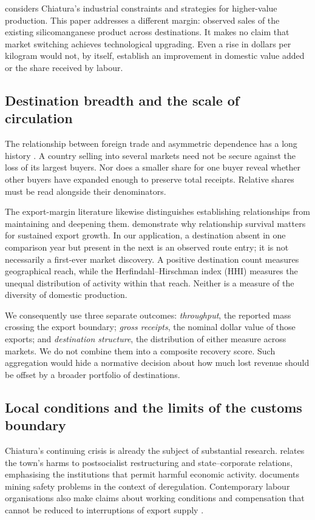 \documentclass[11pt,a4paper]{article}
\begin{document}
\citet{mataradze2025} considers Chiatura's industrial constraints and strategies for higher-value production. This paper addresses a different margin: observed sales of the existing silicomanganese product across destinations. It makes no claim that market switching achieves technological upgrading. Even a rise in dollars per kilogram would not, by itself, establish an improvement in domestic value added or the share received by labour.

\subsection{Destination breadth and the scale of circulation}
The relationship between foreign trade and asymmetric dependence has a long history \citep{hirschman1945}. A country selling into several markets need not be secure against the loss of its largest buyers. Nor does a smaller share for one buyer reveal whether other buyers have expanded enough to preserve total receipts. Relative shares must be read alongside their denominators.

The export-margin literature likewise distinguishes establishing relationships from maintaining and deepening them. \citet{besedes2011} demonstrate why relationship survival matters for sustained export growth. In our application, a destination absent in one comparison year but present in the next is an observed route entry; it is not necessarily a first-ever market discovery. A positive destination count measures geographical reach, while the Herfindahl--Hirschman index (HHI) measures the unequal distribution of activity within that reach. Neither is a measure of the diversity of domestic production.

We consequently use three separate outcomes: \emph{throughput}, the reported mass crossing the export boundary; \emph{gross receipts}, the nominal dollar value of those exports; and \emph{destination structure}, the distribution of either measure across markets. We do not combine them into a composite recovery score. Such aggregation would hide a normative decision about how much lost revenue should be offset by a broader portfolio of destinations.

\subsection{Local conditions and the limits of the customs boundary}
Chiatura's continuing crisis is already the subject of substantial research. \citet{eristavi2026} relates the town's harms to postsocialist restructuring and state--corporate relations, emphasising the institutions that permit harmful economic activity. \citet{hrw2019} documents mining safety problems in the context of deregulation. Contemporary labour organisations also make claims about working conditions and compensation that cannot be reduced to interruptions of export supply \citep{sjc2023b}.
\end{document}
